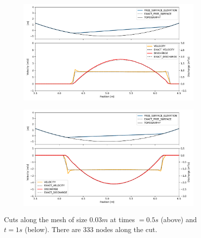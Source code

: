 \documentclass[a4paper,12pt]{article}
\begin{document}
\begin{figure}[H]
\begin{subfigure}{\textwidth}
    \includegraphics[width=\textwidth]{img/par/parabola_t0.5.pdf}
\end{subfigure}
\par\medskip
\begin{subfigure}{\textwidth}
    \includegraphics[width=\textwidth]{img/par/parabola_t1.0.pdf}
\end{subfigure}
\caption{Cuts along the mesh of size $0.03m$ at times $=0.5s$ (above) and $t=1s$ (below). There are 333 nodes along the cut.}
\label{parabola_graphic}
\end{figure}
\end{document}
